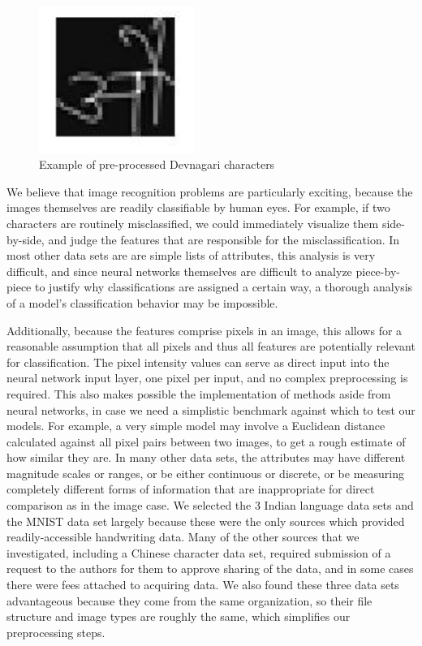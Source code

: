 \documentclass[12pt]{article}  %
\begin{document}
\begin{figure}[htb]
\label{dev}
\begin{center}
\includegraphics[width=2in]{devnagari.png}
\caption{Example of pre-processed Devnagari characters}
\label{dev}
\end{center}
\end{figure} 


We believe that image recognition problems are particularly exciting, because the images themselves are readily classifiable by human eyes. For example, if two characters are routinely misclassified, we could immediately visualize them side-by-side, and judge the features that are responsible for the misclassification. In most other data sets are are simple lists of attributes, this analysis is very difficult, and since neural networks themselves are difficult to analyze piece-by-piece to justify why classifications are assigned a certain way, a thorough analysis of a model’s classification behavior may be impossible. 

Additionally, because the features comprise pixels in an image, this allows for a reasonable assumption that all pixels and thus all features are potentially relevant for classification. The pixel intensity values can serve as direct input into the neural network input layer, one pixel per input, and no complex preprocessing is required. This also makes possible the implementation of methods aside from neural networks, in case we need a simplistic benchmark against which to test our models. For example, a very simple model may involve a Euclidean distance calculated against all pixel pairs between two images, to get a rough estimate of how similar they are. In many other data sets, the attributes may have different magnitude scales or ranges, or be either continuous or discrete, or be measuring completely different forms of information that are inappropriate for direct comparison as in the image case. 
We selected the 3 Indian language data sets and the MNIST data set largely because these were the only sources which provided readily-accessible handwriting data. Many of the other sources that we investigated, including a Chinese character data set, required submission of a request to the authors for them to approve sharing of the data, and in some cases there were fees attached to acquiring data. We also found these three data sets advantageous because they come from the same organization, so their file structure and image types are roughly the same, which simplifies our preprocessing steps.
\end{document}
